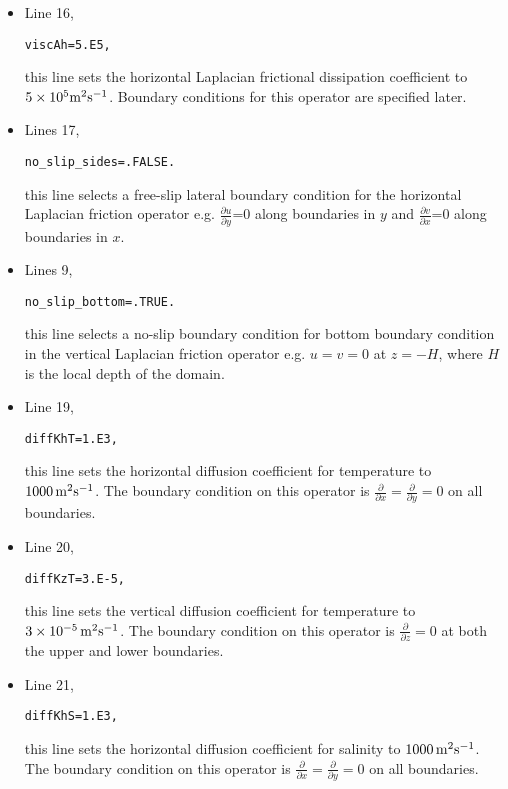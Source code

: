 {\begin{itemize}
\item Line 16, 
\begin{verbatim}
viscAh=5.E5,
\end{verbatim} 
this line sets the horizontal Laplacian frictional dissipation coefficient to
$5 \times 10^{5} {\rm m^{2}s^{-1}}$. Boundary conditions
for this operator are specified later.

\item Lines 17,
\begin{verbatim}
no_slip_sides=.FALSE.
\end{verbatim}
this line selects a free-slip lateral boundary condition for
the horizontal Laplacian friction operator 
e.g. $\frac{\partial u}{\partial y}$=0 along boundaries in $y$ and
$\frac{\partial v}{\partial x}$=0 along boundaries in $x$.

\item Lines 9,
\begin{verbatim}
no_slip_bottom=.TRUE.
\end{verbatim}
this line selects a no-slip boundary condition for bottom
boundary condition in the vertical Laplacian friction operator 
e.g. $u=v=0$ at $z=-H$, where $H$ is the local depth of the domain.

\item Line 19,
\begin{verbatim}
diffKhT=1.E3,
\end{verbatim}
this line sets the horizontal diffusion coefficient for temperature
to $1000\,{\rm m^{2}s^{-1}}$. The boundary condition on this
operator is $\frac{\partial}{\partial x}=\frac{\partial}{\partial y}=0$ on
all boundaries.

\item Line 20,
\begin{verbatim}
diffKzT=3.E-5,
\end{verbatim}
this line sets the vertical diffusion coefficient for temperature
to $3 \times 10^{-5}\,{\rm m^{2}s^{-1}}$. The boundary 
condition on this operator is $\frac{\partial}{\partial z}=0$ at both
the upper and lower boundaries.

\item Line 21,
\begin{verbatim}
diffKhS=1.E3,
\end{verbatim}
this line sets the horizontal diffusion coefficient for salinity
to $1000\,{\rm m^{2}s^{-1}}$. The boundary condition on this
operator is $\frac{\partial}{\partial x}=\frac{\partial}{\partial y}=0$ on
all boundaries.


\end{itemize}}
